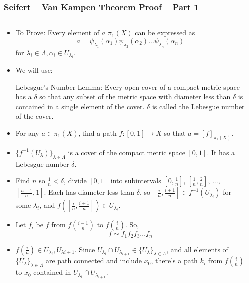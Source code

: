 \documentclass[8pt]{beamer}
\begin{document}
  \begin{frame}
    \frametitle{Seifert -- Van Kampen Theorem Proof -- Part 1}
    \begin{columns}
      \begin{column}[T]{0.5\textwidth}
        \begin{itemize}
          \item To Prove: Every element of $a$ $\pi_1(X)$ can be expressed as
            \[a = \psi_{\lambda_1}(\alpha_1)\psi_{\lambda_2}(\alpha_2) ...
              \psi_{\lambda_n}(\alpha_n)\]
            for $\lambda_i \in \Lambda, \alpha_i \in U_{\lambda_i}$.
          \item We will use:

            Lebesgue's Number Lemma: Every open cover of a compact metric space
            has a $\delta$ so that any subset of the metric space with diameter
            less than $\delta$ is contained in a single element of the cover.
            $\delta$ is called the Lebesgue number of the cover.
          \item For any $a \in \pi_1(X)$, find a path $f : [0,1] \rightarrow X$
            so that $a = [f]_{\pi_1(X)}$.
          \item $\{f^{-1}(U_\lambda)\}_{\lambda
            \in \Lambda}$ is a cover of the compact metric space $[0,1]$. It
            has a Lebesgue number $\delta$.
          \item Find $n$ so $\frac{1}{n} < \delta$, divide $[0,1]$ into
            subintervals $[0,\frac{1}{n}]$, $[\frac{1}{n}, \frac{2}{n}]$, ...,
            $[\frac{n-1}{n},1]$. Each has diameter less than $\delta$, so
            $[\frac{i}{n}, \frac{i+1}{n}] \in f^{-1}(U_{\lambda_i})$ for some
            $\lambda_i$, and $f([\frac{i}{n}, \frac{i+1}{n}]) \in U_{\lambda_i}$.
          \item Let $f_i$ be $f$ from $f(\frac{i-1}{n})$ to $f(\frac{i}{n})$. So,
              \[f \sim f_1 f_2 f_3 ... f_n\]
          \item $f(\frac{i}{n}) \in U_{\lambda_i}, U_{\lambda{i+1}}$. Since
            $U_{\lambda_i} \cap U_{\lambda_{i+1}} \in \{U_\lambda\}_{\lambda
            \in \Lambda}$, and all elements of $\{U_\lambda\}_{\lambda \in
            \Lambda}$ are path connected and include $x_0$, there's a path $k_i$
            from $f(\frac{i}{n})$ to $x_0$ contained in $U_{\lambda_i} \cap
            U_{\lambda_{i+1}}$.

        \end{itemize}
      \end{column}
      \begin{column}[T]{0.5\textwidth}


\end{column}
\end{columns}
\end{frame}
\end{document}
